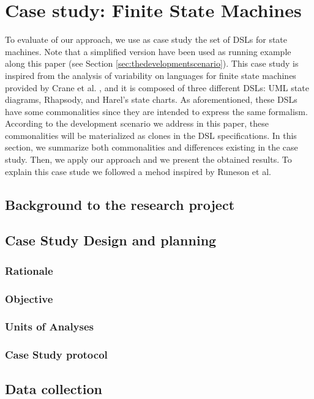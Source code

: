 \section{Case study: Finite State Machines}
\label{sec:validation}

 To evaluate of our approach, we use as case study the set of DSLs for state machines. Note that a simplified version have been used as running example along this paper (see Section \ref{sec:thedevelopmentscenario}). This case study is inspired from the analysis of variability on languages for finite state machines provided by Crane et al. \cite{Crane:2007}, and it is composed of three different DSLs: UML state diagrams, Rhapsody, and Harel's state charts. As aforementioned, these DSLs have some commonalities since they are intended to express the same formalism. According to the development scenario we address in this paper, these commonalities will be materialized as clones in the DSL specifications. In this section, we summarize both commonalities and differences existing in the case study. Then, we apply our approach and we present the obtained results. To explain this case stude we followed a mehod inspired by Runeson et al\cite{runeson-book}.

\subsection{Background to the research project}

\subsection{Case Study Design and planning}
\subsubsection{Rationale}
\subsubsection{Objective}
\subsubsection{Units of Analyses}
\subsubsection{Case Study protocol}

\subsection{Data collection}


